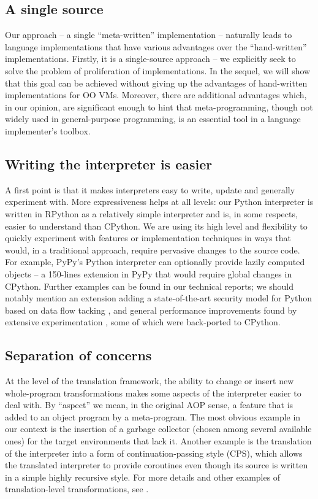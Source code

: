 \documentclass{llncs}
\begin{document}
\subsection{A single source}

Our approach -- a single ``meta-written'' implementation -- naturally
leads to language implementations that have various advantages over the
``hand-written'' implementations.  Firstly, it is a single-source
approach -- we explicitly seek to solve the problem of proliferation of
implementations.  In the sequel, we will show that this goal can be
achieved without giving up the advantages of hand-written
implementations for OO VMs.  Moreover, there are additional advantages which,
in our opinion, are significant enough to hint that meta-programming,
though not widely used in general-purpose programming, is an essential
tool in a language implementer's toolbox.

\subsection{Writing the interpreter is easier}

A first point is that it makes interpreters easy to write, update and
generally experiment with.  More expressiveness helps at all levels: our
Python interpreter is written in RPython as a relatively simple
interpreter and is, in some respects, easier to understand than CPython.  We are
using its high level and flexibility to quickly experiment with features
or implementation techniques in ways that would, in a traditional
approach, require pervasive changes to the source code.  For example,
PyPy's Python interpreter can optionally provide lazily computed objects
-- a 150-lines extension in PyPy that would require global changes in
CPython.  Further examples can be found in our technical reports; we
should notably mention an extension adding a state-of-the-art security
model for Python based on data flow tacking \cite{D12.1}, and general
performance improvements found by extensive experimentation \cite{D06.1}, some
of which were back-ported to CPython.

\subsection{Separation of concerns}

At the level of the translation framework, the ability to change or
insert new whole-program transformations makes some aspects of the
interpreter easier to deal with.  By ``aspect'' we mean, in the original
AOP sense, a feature that is added to an object program by a
meta-program.  The most obvious example in our context is the insertion
of a garbage collector (chosen among several available ones) for the
target environments that lack it.  Another example is the translation of
the interpreter into a form of continuation-passing style (CPS), which
allows the translated interpreter to provide coroutines even though its
source is written in a simple highly recursive style.  For more details
and other examples of translation-level transformations, see
\cite{D07.1}.
\end{document}
